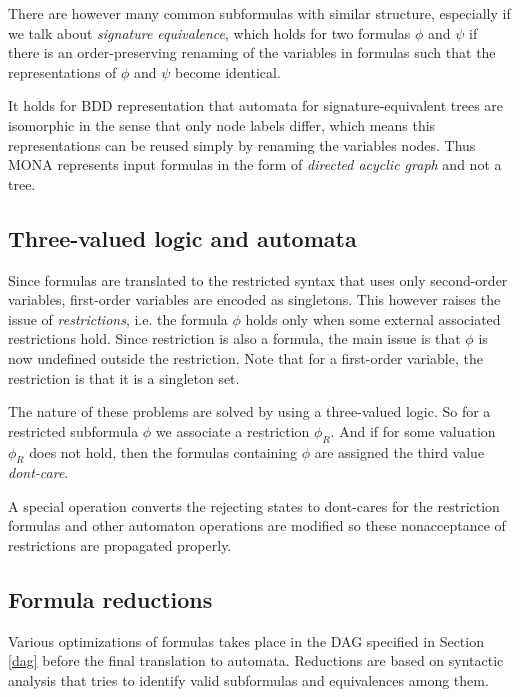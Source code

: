 There are however many common subformulas with similar structure, especially if we talk about \emph{signature equivalence}, which holds for two formulas $\phi$ and $\psi$ if there is an order-preserving renaming of the variables in formulas such that the representations of $\phi$ and $\psi$ become identical.

It holds for BDD representation that automata for signature-equivalent trees are isomorphic in the sense that only node labels differ, which means this representations can be reused simply by renaming the variables nodes. Thus MONA represents input formulas in the form of \emph{directed acyclic graph} and not a tree. 

\subsection{Three-valued logic and automata}
Since formulas are translated to the restricted syntax that uses only second-order variables, first-order variables are encoded as singletons. This however raises the issue of \emph{restrictions}, i.e. the formula $\phi$ holds only when some external associated restrictions hold. Since restriction is also a formula, the main issue is that $\phi$ is now undefined outside the restriction. Note that for a first-order variable, the restriction is that it is a singleton set. 

The nature of these problems are solved by using a three-valued logic. So for a restricted subformula $\phi$ we associate a restriction $\phi_R$. And if for some valuation $\phi_R$ does not hold, then the formulas containing $\phi$ are assigned the third value \emph{dont-care}.

A special operation converts the rejecting states to dont-cares for the restriction formulas and other automaton operations are modified so these nonacceptance of restrictions are propagated properly. 

\subsection{Formula reductions}
Various optimizations of formulas takes place in the DAG specified in Section \ref{dag} before the final translation to automata. Reductions are based on syntactic analysis that tries to identify valid subformulas and equivalences among them. 

